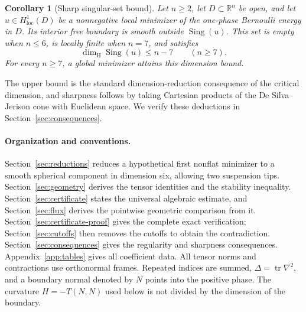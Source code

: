 \documentclass[11pt]{article}
\newcommand{\R}{\mathbb R}
\DeclareMathOperator{\tr}{tr}
\newtheorem{corollary}[theorem]{Corollary}
\theoremstyle{definition}
\theoremstyle{remark}
\numberwithin{equation}{section}
\begin{document}
\begin{corollary}[Sharp singular-set bound]\label{cor:singular-set}
Let $n\ge2$, let $D\subset\R^n$ be open, and let $u\in H^1_{\mathrm{loc}}(D)$ be a nonnegative local
minimizer of the one-phase Bernoulli energy in $D$.
Its interior free boundary is smooth outside $\operatorname{Sing}(u)$.
This set is empty when $n\le6$, is locally finite when $n=7$, and satisfies
\[
 \dim_{\mathrm H}\operatorname{Sing}(u)\le n-7\qquad(n\ge7).
\]
For every $n\ge7$, a global minimizer attains this dimension bound.
\end{corollary}

The upper bound is the standard dimension-reduction consequence of the
critical dimension, and sharpness follows by taking Cartesian products of
the De Silva--Jerison cone with Euclidean space. We verify these deductions
in Section~\ref{sec:consequences}.



\paragraph{Organization and conventions.}
Section~\ref{sec:reductions} reduces a hypothetical first nonflat minimizer
to a smooth spherical component in dimension six, allowing two suspension
tips. Section~\ref{sec:geometry} derives the tensor identities and the
stability inequality. Section~\ref{sec:certificate} states the universal
algebraic estimate, and Section~\ref{sec:flux} derives the pointwise
geometric comparison from it. Section~\ref{sec:certificate-proof} gives
the complete exact verification; Section~\ref{sec:cutoffs} then removes
the cutoffs to obtain the contradiction. Section~\ref{sec:consequences}
gives the regularity and sharpness consequences.
Appendix~\ref{app:tables} gives all coefficient data.
All tensor norms and contractions use orthonormal frames. Repeated indices
are summed, \(\Delta=\tr\nabla^2\), and a boundary normal denoted by \(N\)
points into the positive phase. The curvature \(H=-T(N,N)\) used below is
not divided by the dimension of the boundary.









\appendix



\end{document}
